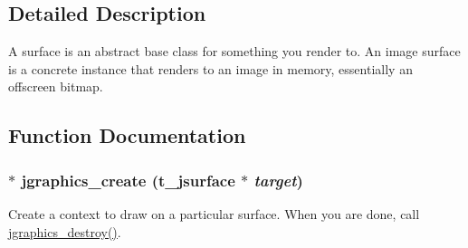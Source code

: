

\subsection{Detailed Description}
A surface is an abstract base class for something you render to. An image surface is a concrete instance that renders to an image in memory, essentially an offscreen bitmap. 

\subsection{Function Documentation}
\hypertarget{group__jsurface_ga7748ae17fe303820fe7b0afcca104c45}{
\subsubsection[{jgraphics\_\-create}]{$\ast$ jgraphics\_\-create ({\bf t\_\-jsurface} $\ast$ {\em target})}}
\label{group__jsurface_ga7748ae17fe303820fe7b0afcca104c45}


Create a context to draw on a particular surface. When you are done, call \hyperlink{group__jgraphics_ga910977684c0f03be9edfb9f861905d5e}{jgraphics\_\-destroy()}.


